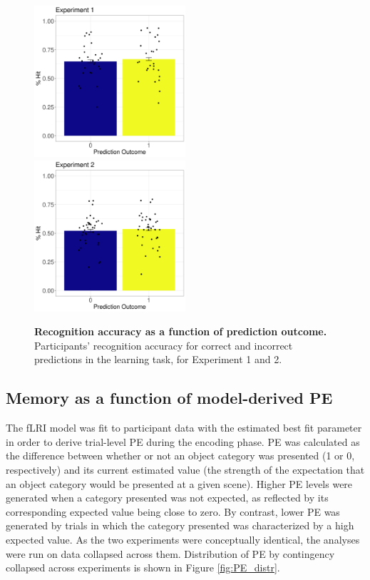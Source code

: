 \documentclass[a4paper,12pt]{article}
\begin{document}
\begin{figure}[ht!]
{\includegraphics[width=0.5\textwidth]{figures/prediction_acc_exp1.png}} \hfill
{\includegraphics[width=0.5\textwidth]{figures/prediction_acc_exp2.png}} 
\caption{\textbf{Recognition accuracy as a function of prediction outcome.}
Participants' recognition accuracy for correct and incorrect predictions in the learning task, for Experiment 1 and 2. }
\label{fig:prediction_cond}
\end{figure}

\subsection{Memory as a function of model-derived PE}
The fLRI model was fit to participant data with the estimated best fit parameter in order to derive trial-level PE during the encoding phase. PE was calculated as the difference between whether or not an object category was presented (1 or 0, respectively) and its current estimated value (the strength of the expectation that an object category would be presented at a given scene). Higher PE levels were generated when a category presented was not expected, as reflected by its corresponding expected value being close to zero. By contrast, lower PE was generated by trials in which the category presented was characterized by a high expected value. As the two experiments were conceptually identical, the analyses were run on data collapsed across them. Distribution of PE by contingency collapsed across experiments is shown in Figure \ref{fig:PE_distr}. 
\end{document}
